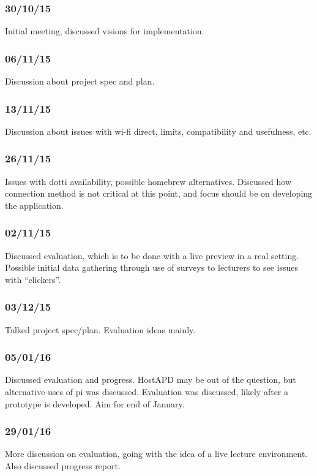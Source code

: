 \documentclass{article}
\begin{document}
\subsubsection{30/10/15}
Initial meeting, discussed visions for implementation.

\subsubsection{06/11/15}
Discussion about project spec and plan.

\subsubsection{13/11/15}
Discussion about issues with wi-fi direct, limits, compatibility and usefulness, etc.

\subsubsection{26/11/15} 
Issues with dotti availability, possible homebrew alternatives. Discussed how connection method is not critical at this point, and focus should be on developing the application.

\subsubsection{02/11/15}
Discussed evaluation, which is to be done with a live preview in a real setting.
Possible initial data gathering through use of surveys to lecturers to see issues with ``clickers''.

\subsubsection{03/12/15}
Talked project spec/plan. Evaluation ideas mainly.

\subsubsection{05/01/16}
Discussed evaluation and progress. HostAPD may be out of the question, but alternative uses of pi was discussed.
Evaluation was discussed, likely after a prototype is developed. Aim for end of January.

\subsubsection{29/01/16}
More discussion on evaluation, going with the idea of a live lecture environment. Also discussed progress report.
\end{document}
